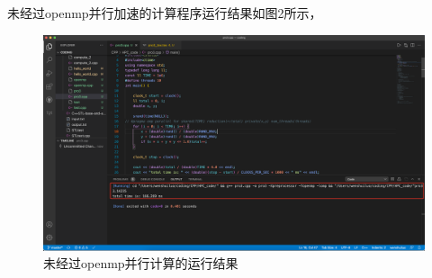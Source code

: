 \documentclass[12pt]{article}
\begin{document}
	未经过openmp并行加速的计算程序运行结果如图2所示，
	\begin{figure}[h]
		\centering
		\includegraphics[width=1.0\textwidth]{omp1.png}
		\caption{未经过openmp并行计算的运行结果}
	\end{figure}
\end{document}

